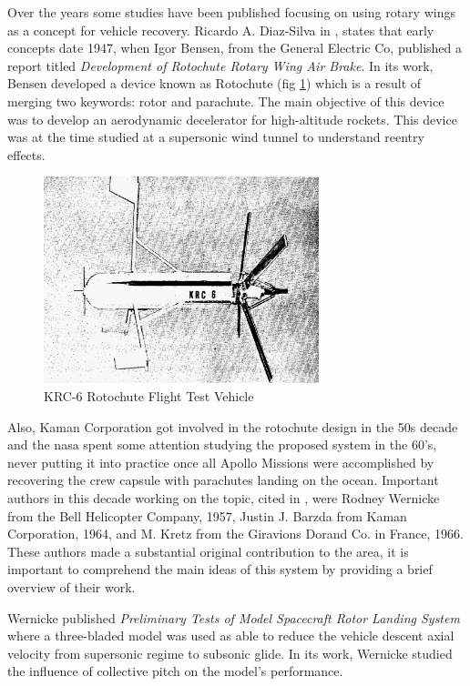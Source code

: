 Over the years some studies have been published focusing on using rotary wings as a concept for vehicle recovery. Ricardo A. Diaz-Silva in \cite{diaz-silva_rotary_2013}, states that early concepts date 1947, when Igor Bensen, from the General Electric Co, published a report titled \textit{Development of Rotochute Rotary Wing Air Brake}. In its work, Bensen developed a device known as Rotochute (fig \ref{fig:rotochute_prototype}) which is a result of merging two keywords: rotor and parachute. The main objective of this device was to develop an aerodynamic decelerator for high-altitude rockets. This device was at the time studied at a supersonic wind tunnel to understand reentry effects. 

\begin{figure}[!htb]
    \centering
    \includegraphics[width=8cm]{Figures/literature_review/rotochute_prototype.eps}
    \caption{KRC-6 Rotochute Flight Test Vehicle}
    \label{fig:rotochute_prototype}
\end{figure}

Also, Kaman Corporation got involved in the rotochute design in the 50s decade and the \gls{nasa} spent some attention studying the proposed system in the 60's, never putting it into practice once all Apollo Missions \cite{noauthor_apollo_nodate} were accomplished by recovering the crew capsule with parachutes landing on the ocean. Important authors in this decade working on the topic, cited in \cite{diaz-silva_rotary_2013}, were Rodney Wernicke from the Bell Helicopter Company, 1957, Justin J. Barzda from Kaman Corporation, 1964, and M. Kretz from the Giravions Dorand Co. in France, 1966. These authors made a substantial original contribution to the area, it is important to comprehend the main ideas of this system by providing a brief overview of their work.

Wernicke published \textit{Preliminary Tests of Model Spacecraft Rotor Landing System} where a three-bladed model was used as able to reduce the vehicle descent axial velocity from supersonic regime to subsonic glide. In its work, Wernicke studied the influence of collective pitch on the model's performance.

